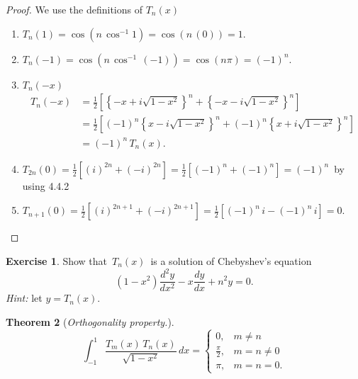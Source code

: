 \documentclass[12pt,a4paper]{report}
\theoremstyle{definition}
\newtheorem{thm}{Theorem}[section]
\newtheorem{exe}[thm]{Exercise}
\theoremstyle{plain}
\begin{document}
\begin{proof}
We use the definitions of $T_n(x)$
\vspace{-3mm}
\begin{enumerate}
\item[(a).] $T_n(1) = \cos \left(n\, \cos^{-1} 1\right) = \cos (n\, (0)) = 1.$

\item[(b).] $T_n(-1) = \cos\left(n\, \cos^{-1}\, (-1)\right) = \cos (n\pi) = (-1)^n.$

\item[(c).] $T_n(-x)$
\begin{align*}
T_n(-x) & = \frac{1}{2}\left[\left\{-x + i\sqrt{1 - x^2}\right\}^n + \left\{-x - i\sqrt{1 - x^2}\right\}^n\right]\\
        & = \frac{1}{2}\left[(-1)^n\left\{x - i\sqrt{1 - x^2}\right\}^n + (-1)^n\left\{x + i\sqrt{1 - x^2}\right\}^n\right]\\
        & = (-1)^n\, T_n(x).
\end{align*}

\item[(d).] $T_{2n}(0) = \frac{1}{2}\left[(i)^{2n}  + (-i)^{2n}\right] = \frac{1}{2}\left[(-1)^n + (-1)^n\right] = (-1)^n\,$ by using 4.4.2

\item[(e).] $T_{n+1}(0) = \frac{1}{2}\left[(i)^{2n+1}  + (-i)^{2n+1}\right] = \frac{1}{2}\left[(-1)^n\, i - (-1)^n\, i\right] = 0.$
\end{enumerate}
\end{proof}


\begin{exe}
Show that $\, T_n(x)\,$ is a solution of Chebyshev's equation $$(1 - x^2)\frac{d^2y}{dx^2} - x\frac{dy}{dx} + n^2 y = 0.$$ 
\textit{Hint:} let $y = T_n(x)$.
\end{exe}


\begin{thm}[\textit{Orthogonality property.}]
$$\int_{-1}^1\frac{T_m(x)\, T_n(x)}{\sqrt{1 - x^2}}\, dx = \begin{cases}
                                                            0, & m\neq n\\
                                                            \frac{\pi}{2}, & m = n \neq 0\\
                                                            \pi, & m = n = 0.
                                                           \end{cases}$$
\end{thm}
\end{document}
